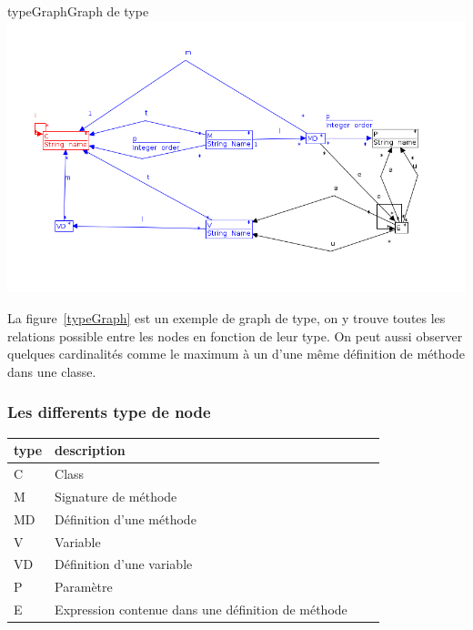 \documentclass[a4paper, 12pt]{article}
\begin{document}
\begin{myfig}{typeGraph}{Graph de type}
\includegraphics[width=\textwidth]{typeGraph.png}
\end{myfig}

La figure~\ref{typeGraph} est un exemple de graph de type, on y trouve toutes les relations possible entre les nodes en fonction de leur type.
On peut aussi observer quelques cardinalités comme le maximum à un d'une même définition de méthode dans une classe.

\subsubsection{Les differents type de node}

  \begin{tabular}{ | l | l | l | p{5cm} |}
    \hline
    type & description  \\ \hline
    C & Class   \\ \hline
    M & Signature de méthode   \\ \hline
    MD &  Définition d'une méthode   \\ \hline
    V &  Variable   \\ \hline
    VD &  Définition d'une variable \\ \hline
    P & Paramètre \\ \hline
    E &  Expression contenue dans une définition de méthode \\ \hline
    \end{tabular}
\end{document}

